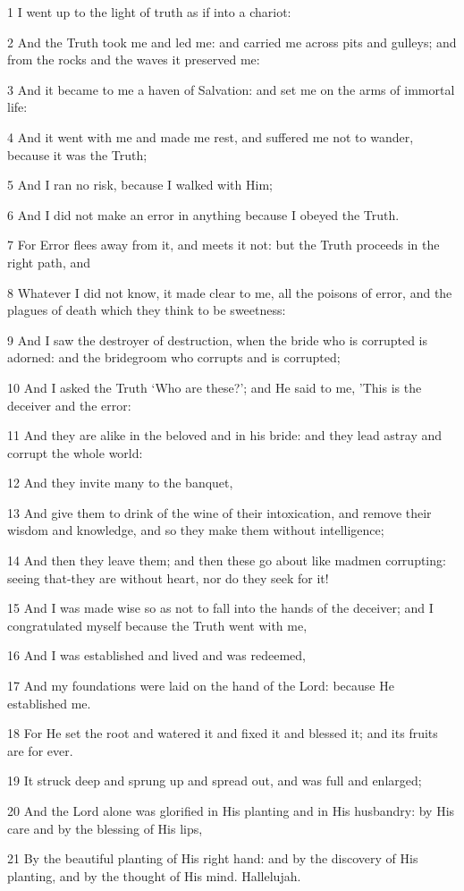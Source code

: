 \par 1 I went up to the light of truth as if into a chariot:
\par 2 And the Truth took me and led me: and carried me across pits and gulleys; and from the rocks and the waves it preserved me:
\par 3 And it became to me a haven of Salvation: and set me on the arms of immortal life:
\par 4 And it went with me and made me rest, and suffered me not to wander, because it was the Truth;
\par 5 And I ran no risk, because I walked with Him;
\par 6 And I did not make an error in anything because I obeyed the Truth.
\par 7 For Error flees away from it, and meets it not: but the Truth proceeds in the right path, and
\par 8 Whatever I did not know, it made clear to me, all the poisons of error, and the plagues of death which they think to be sweetness:
\par 9 And I saw the destroyer of destruction, when the bride who is corrupted is adorned: and the bridegroom who corrupts and is corrupted;
\par 10 And I asked the Truth ‘Who are these?’; and He said to me, 'This is the deceiver and the error:
\par 11 And they are alike in the beloved and in his bride: and they lead astray and corrupt the whole world:
\par 12 And they invite many to the banquet,
\par 13 And give them to drink of the wine of their intoxication, and remove their wisdom and knowledge, and so they make them without intelligence;
\par 14 And then they leave them; and then these go about like madmen corrupting: seeing that-they are without heart, nor do they seek for it!
\par 15 And I was made wise so as not to fall into the hands of the deceiver; and I congratulated myself because the Truth went with me,
\par 16 And I was established and lived and was redeemed,
\par 17 And my foundations were laid on the hand of the Lord: because He established me.
\par 18 For He set the root and watered it and fixed it and blessed it; and its fruits are for ever.
\par 19 It struck deep and sprung up and spread out, and was full and enlarged;
\par 20 And the Lord alone was glorified in His planting and in His husbandry: by His care and by the blessing of His lips,
\par 21 By the beautiful planting of His right hand: and by the discovery of His planting, and by the thought of His mind. Hallelujah.

